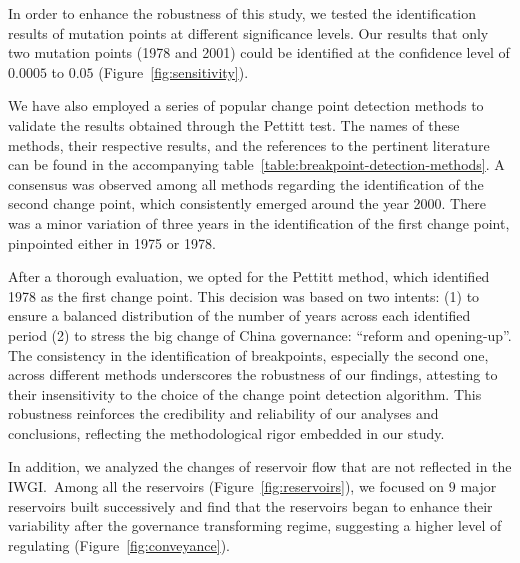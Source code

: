 In order to enhance the robustness of this study, we tested the identification results of mutation points at different significance levels.
Our results that only two mutation points (1978 and 2001) could be identified at the confidence level of $0.0005$ to $0.05$ (Figure~\ref{fig:sensitivity}).

We have also employed a series of popular change point detection methods to validate the results obtained through the Pettitt test. The names of these methods, their respective results, and the references to the pertinent literature can be found in the accompanying table~\ref{table:breakpoint-detection-methods}. A consensus was observed among all methods regarding the identification of the second change point, which consistently emerged around the year 2000. There was a minor variation of three years in the identification of the first change point, pinpointed either in 1975 or 1978.

After a thorough evaluation, we opted for the Pettitt method, which identified 1978 as the first change point. This decision was based on two intents: (1) to ensure a balanced distribution of the number of years across each identified period (2) to stress the big change of China governance: ``reform and opening-up''. The consistency in the identification of breakpoints, especially the second one, across different methods underscores the robustness of our findings, attesting to their insensitivity to the choice of the change point detection algorithm. This robustness reinforces the credibility and reliability of our analyses and conclusions, reflecting the methodological rigor embedded in our study.



In addition, we analyzed the changes of reservoir flow that are not reflected in the IWGI.\ Among all the reservoirs (Figure~\ref{fig:reservoirs}), we focused on $9$ major reservoirs built successively and find that the reservoirs began to enhance their variability after the governance transforming regime, suggesting a higher level of regulating (Figure~\ref{fig:conveyance}).

